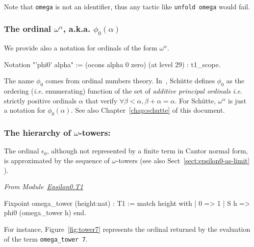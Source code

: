 Note that \texttt{omega} is not an identifier, thus any tactic like \texttt{unfold omega} would fail.


\subsubsection{The ordinal \(\omega^\alpha\), a.k.a. \(\phi_0(\alpha)\)}
\label{sect:notation-phi0}
We provide also a notation for ordinals of the form $\omega^\alpha$.


\begin{Coqsrc}
Notation "'phi0' alpha" := (ocons alpha 0 zero) (at level 29) : t1_scope.
\end{Coqsrc}


\begin{remark}
\label{sec:orgheadline69}
The name \(\phi_0\)
   comes from ordinal numbers theory. In~\cite{schutte}, Schütte defines 
$\phi_0$  as the ordering (\emph{i.e.} enumerating) function of the set  of \emph{additive principal ordinals} \emph{i.e.} strictly positive ordinals $\alpha$ that verify $\forall \beta<\alpha, \beta+\alpha=\alpha$. For Schütte,  $\omega^\alpha$ is just a notation for $\phi_0(\alpha)$.  See also Chapter~\ref{chap:schutte} of this document.
\end{remark}



  
\subsubsection{The hierarchy of \(\omega\)-towers:}
\label{sec:orgheadline71}

The ordinal $\epsilon_0$, although not represented by a finite term in Cantor normal form, is approximated by the sequence of $\omega$-towers (see also Sect~\vref{sect:epsilon0-as-limit} ).

\vspace{4pt}
\emph{From Module~\href{../theories/html/hydras.Epsilon0.T1.html}{Epsilon0.T1}}

\begin{Coqsrc}
Fixpoint omega_tower (height:nat) : T1 := 
 match height with 
 | 0 =>  1 
 | S h => phi0 (omega_tower h)
 end.
\end{Coqsrc}

For instance, Figure~\ref{fig:tower7} represents  the ordinal returned by the
 evaluation of the term \texttt{omega\_tower 7}.

